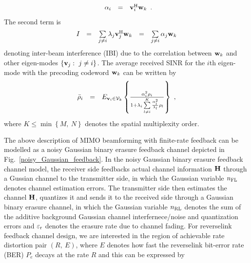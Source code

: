\documentclass[10pt,fleqn, twocolumn]{IEEEtran}
\newcommand{\bH}{{\bf H}}
\newcommand{\bv}{{\bf v}}
\newcommand{\bw}{{\bf w}}
\begin{document}
\begin{equation}
\begin{array}{rcl}
\alpha_{i}&=&\bv_{i}^{\rm H}\bw_k
\end{array}.\label{alpha}
\end{equation}
\noindent The second term is
\begin{equation}
\begin{array}{rcccl}
I_{} & = & \sum\limits_{j\neq i}\lambda_{j}\bv_{j}^{\rm
H}\bw_{k}&=&\sum\limits_{j\neq i}\alpha_{j}\bw_{k}
\end{array}\label{IBI}
\end{equation}
\noindent denoting inter-beam interference (IBI) due to the
correlation between $\bw_{k}$ and other eigen-modes
$\left\{\bv_{j}:\ j\neq i\right\}$. The average received SINR for
the $i$th eigen-mode with the precoding codeword $\bw_{k}$ can be
written by
\begin{equation}
\begin{array}{rcl}
\bar\rho_{i} &=&\mbox{E}_{\bv_{i}\in{\cal
V}_{k}}\left\{\frac{\alpha_{i}^{2}\rho_{i}}{1+
\lambda_{i}\sum\limits_{l\neq
i}^{K}\frac{\alpha_{l}^{2}}{\lambda_{l}}\rho_{l}}\right\}\ ,
\end{array}\label{bar_rho}
\end{equation}
\noindent where $K\leq\min\left\{M,\ N\right\}$ denotes the
spatial multiplexity order.

\begin{figure}
\end{figure}

The above description of MIMO beamforming with finite-rate
feedback can be modelled as a noisy Gaussian binary erasure
feedback channel depicted in Fig.~\ref{noisy_Gaussian_feedback}.
In the noisy Gaussian binary erasure feedback channel model, the
receiver side feedbacks actual channel information $\bH$ through a
Gussian channel to the transmitter side, in which the Gaussian
variable $n_{\rm FL}$ denotes channel estimation errors.  The
transmitter side then estimates the channel $\bH$, quantizes it
and sends it to the received side through a Gaussian binary
erasure channel, in which the Gaussian variable $n_{\rm RL}$
denotes the sum of the additive background Gaussian channel
interfernece/noise and quantization errors and $\varepsilon_{\rm
r}$ denotes the erasure rate due to channel fading. For
reverselink feedback channel design, we are interested in the
region of achievable rate distortion pair $\left(R,\ E\right)$,
where $E$ denotes how fast the reverselink bit-error rate (BER)
$P_{e}$ decays at the rate $R$ and this can be expressed by
\end{document}
